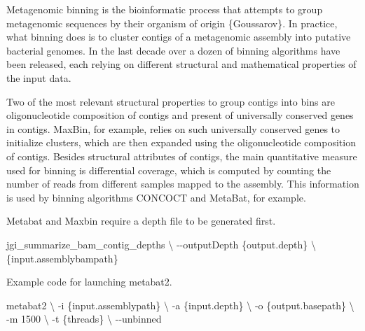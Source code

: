 \documentclass[
]{book}
\newenvironment{Shaded}{\begin{snugshade}}{\end{snugshade}}
\newcommand{\AttributeTok}[1]{\textcolor[rgb]{0.77,0.63,0.00}{#1}}
\newcommand{\DataTypeTok}[1]{\textcolor[rgb]{0.13,0.29,0.53}{#1}}
\newcommand{\ExtensionTok}[1]{#1}
\newcommand{\NormalTok}[1]{#1}
\begin{document}
Metagenomic binning is the bioinformatic process that attempts to group metagenomic sequences by their organism of origin \{Goussarov\}. In practice, what binning does is to cluster contigs of a metagenomic assembly into putative bacterial genomes. In the last decade over a dozen of binning algorithms have been released, each relying on different structural and mathematical properties of the input data.

Two of the most relevant structural properties to group contigs into bins are oligonucleotide composition of contigs and present of universally conserved genes in contigs. MaxBin, for example, relies on such universally conserved genes to initialize clusters, which are then expanded using the oligonucleotide composition of contigs. Besides structural attributes of contigs, the main quantitative measure used for binning is differential coverage, which is computed by counting the number of reads from different samples mapped to the assembly. This information is used by binning algorithms CONCOCT and MetaBat, for example.

Metabat and Maxbin require a depth file to be generated first.
\small

\begin{Shaded}
\begin{Highlighting}[]
\ExtensionTok{jgi\_summarize\_bam\_contig\_depths} \DataTypeTok{\textbackslash{}}
    \AttributeTok{{-}{-}outputDepth}\NormalTok{ \{output.depth\} }\DataTypeTok{\textbackslash{}}
\NormalTok{    \{input.assemblybampath\}}
\end{Highlighting}
\end{Shaded}

\normalsize

Example code for launching metabat2.
\small

\begin{Shaded}
\begin{Highlighting}[]
\ExtensionTok{metabat2} \DataTypeTok{\textbackslash{}}
    \AttributeTok{{-}i}\NormalTok{ \{input.assemblypath\} }\DataTypeTok{\textbackslash{}}
    \AttributeTok{{-}a}\NormalTok{ \{input.depth\} }\DataTypeTok{\textbackslash{}}
    \AttributeTok{{-}o}\NormalTok{ \{output.basepath\} }\DataTypeTok{\textbackslash{}}
    \AttributeTok{{-}m}\NormalTok{ 1500 }\DataTypeTok{\textbackslash{}}
    \AttributeTok{{-}t}\NormalTok{ \{threads\} }\DataTypeTok{\textbackslash{}}
    \AttributeTok{{-}{-}unbinned}
\end{Highlighting}
\end{Shaded}
\end{document}
